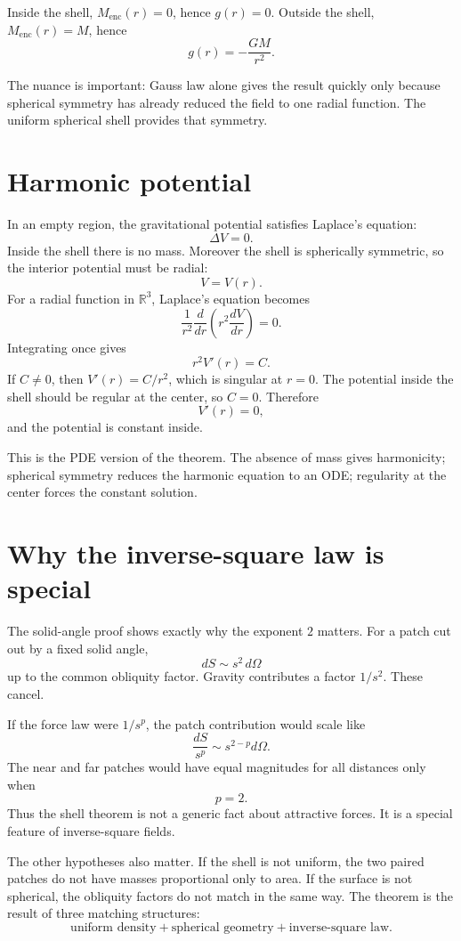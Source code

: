 Inside the shell, \(M_{\mathrm{enc}}(r)=0\), hence \(g(r)=0\).  Outside the shell, \(M_{\mathrm{enc}}(r)=M\), hence
\[
  g(r)=-\frac{GM}{r^2}.
\]

The nuance is important: Gauss law alone gives the result quickly only because spherical symmetry has already reduced the field to one radial function.  The uniform spherical shell provides that symmetry.

\section{Harmonic potential}

In an empty region, the gravitational potential satisfies Laplace's equation:
\[
  \Delta V=0.
\]
Inside the shell there is no mass.  Moreover the shell is spherically symmetric, so the interior potential must be radial:
\[
  V=V(r).
\]
For a radial function in \(\mathbb R^3\), Laplace's equation becomes
\[
  \frac1{r^2}\frac{d}{dr}\left(r^2\frac{dV}{dr}\right)=0.
\]
Integrating once gives
\[
  r^2V'(r)=C.
\]
If \(C\ne0\), then \(V'(r)=C/r^2\), which is singular at \(r=0\).  The potential inside the shell should be regular at the center, so \(C=0\).  Therefore
\[
  V'(r)=0,
\]
and the potential is constant inside.

This is the PDE version of the theorem.  The absence of mass gives harmonicity; spherical symmetry reduces the harmonic equation to an ODE; regularity at the center forces the constant solution.

\section{Why the inverse-square law is special}

The solid-angle proof shows exactly why the exponent \(2\) matters.  For a patch cut out by a fixed solid angle,
\[
  dS\sim s^2\,d\Omega
\]
up to the common obliquity factor.  Gravity contributes a factor \(1/s^2\).  These cancel.

If the force law were \(1/s^p\), the patch contribution would scale like
\[
  \frac{dS}{s^p}\sim s^{2-p}d\Omega.
\]
The near and far patches would have equal magnitudes for all distances only when
\[
  p=2.
\]
Thus the shell theorem is not a generic fact about attractive forces.  It is a special feature of inverse-square fields.

The other hypotheses also matter.  If the shell is not uniform, the two paired patches do not have masses proportional only to area.  If the surface is not spherical, the obliquity factors do not match in the same way.  The theorem is the result of three matching structures:
\[
  \text{uniform density}+\text{spherical geometry}+\text{inverse-square law}.
\]


